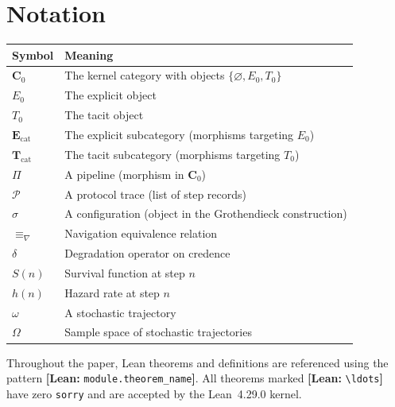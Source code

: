 \documentclass[preprints,article,accept,pdftex,oneauthor]{Definitions/mdpi}
\newcommand{\leanref}[1]{\textbf{[Lean:} \nolinkurl{#1}\textbf{]}}
\newcommand{\Czero}{\mathbf{C}_0}
\newcommand{\Ecat}{\mathbf{E}_{\mathrm{cat}}}
\newcommand{\Tcat}{\mathbf{T}_{\mathrm{cat}}}
\newcommand{\Eobj}{E_0}
\newcommand{\Tobj}{T_0}
\newcommand{\navequiv}{\equiv_\nabla}
\begin{document}

\maketitle

\newpage
\tableofcontents
\newpage

\section*{Notation}

\begin{center}
\begin{tabular}{ll}
\toprule
Symbol & Meaning \\
\midrule
$\Czero$ & The kernel category with objects $\{\varnothing, \Eobj, \Tobj\}$ \\
$\Eobj$ & The explicit object \\
$\Tobj$ & The tacit object \\
$\Ecat$ & The explicit subcategory (morphisms targeting $\Eobj$) \\
$\Tcat$ & The tacit subcategory (morphisms targeting $\Tobj$) \\
$\Pi$ & A pipeline (morphism in $\Czero$) \\
$\mathcal{P}$ & A protocol trace (list of step records) \\
$\sigma$ & A configuration (object in the Grothendieck construction) \\
$\navequiv$ & Navigation equivalence relation \\
$\delta$ & Degradation operator on credence \\
$S(n)$ & Survival function at step $n$ \\
$h(n)$ & Hazard rate at step $n$ \\
$\omega$ & A stochastic trajectory \\
$\Omega$ & Sample space of stochastic trajectories \\
\bottomrule
\end{tabular}
\end{center}

Throughout the paper, Lean theorems and definitions are referenced using the pattern
\leanref{module.theorem\_name}. All theorems marked \leanref{\ldots} have zero
\texttt{sorry} and are accepted by the Lean~4.29.0 kernel.

\newpage


\newpage

\newpage

\newpage

\newpage

\newpage

\newpage

\newpage


\end{document}
